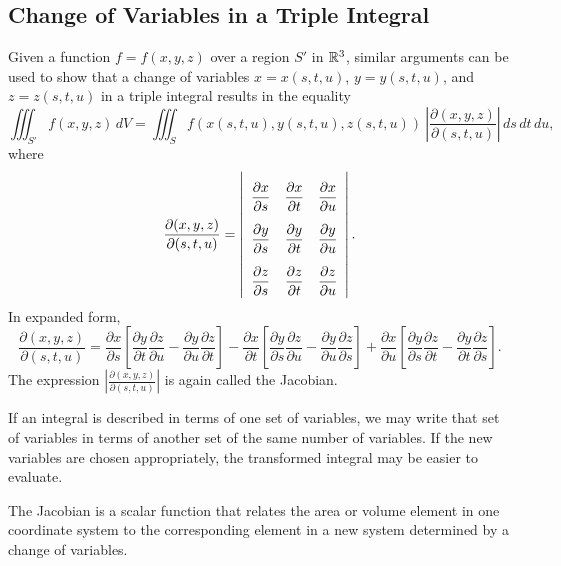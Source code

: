 




\subsection*{Change of Variables in a Triple Integral}

Given a function $f = f(x,y,z)$ over a region $S'$ in $\mathbb{R}^3$, similar arguments can be used to show that a change of variables $x=x(s,t,u)$, $y=y(s,t,u)$, and $z = z(s,t,u)$ in a triple integral results in the equality
\[\iiint_{S'} f(x,y,z) \, dV = \iiint_{S} f(x(s,t,u),y(s,t,u),z(s,t,u)) \ \left| \frac{\partial(x,y,z)}{\partial(s,t,u)} \right| \, ds \, dt \, du,\]
where
\[\frac{\partial(x,y,z)}{\partial(s,t,u)} = \left| \renewcommand{\tabcolsep}{0.1cm}
\renewcommand{\arraystretch}{2.5}
\begin{array}{ccc} \ds \frac{\partial x}{\partial s} & \ds \frac{\partial x}{\partial t} & \ds \frac{\partial x}{\partial u} \\ \ds \frac{\partial y}{\partial s} & \ds \frac{\partial y}{\partial t} & \ds \frac{\partial y}{\partial u} \\ \ds \frac{\partial z}{\partial s} & \ds \frac{\partial z}{\partial t} & \ds \frac{\partial z}{\partial u} \end{array} \right|.\]
In expanded form,
\[\frac{\partial(x,y,z)}{\partial(s,t,u)} = \frac{\partial x}{\partial s}\left[\frac{\partial y}{\partial t}\frac{\partial z}{\partial u} - \frac{\partial y}{\partial u}\frac{\partial z}{\partial t}\right] - \frac{\partial x}{\partial t}\left[\frac{\partial y}{\partial s}\frac{\partial z}{\partial u} - \frac{\partial y}{\partial u}\frac{\partial z}{\partial s}\right] + \frac{\partial x}{\partial u}\left[\frac{\partial y}{\partial s}\frac{\partial z}{\partial t} - \frac{\partial y}{\partial t}\frac{\partial z}{\partial s}\right].\]
The expression $\left|\frac{\partial(x,y,z)}{\partial(s,t,u)}\right|$ is again called the Jacobian.

%

\begin{summary}
\item If an integral is described in terms of one set of variables, we may write that set of variables in terms of another set of the same number of variables. If the new variables are chosen appropriately, the transformed integral may be easier to evaluate. 
\item The Jacobian is a scalar function that relates the area or volume element in one coordinate system to the corresponding element in a new system determined by a change of variables. 
\end{summary}

\nin \hrulefill



\clearpage

